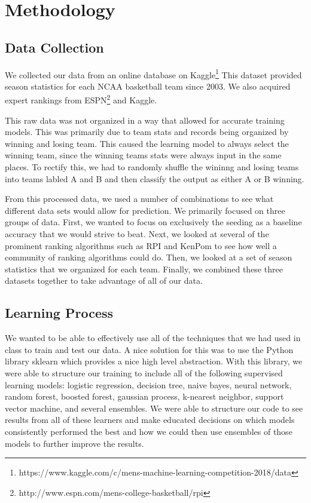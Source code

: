 \section{Methodology}

\subsection{Data Collection}
We collected our data from an online database on Kaggle\footnote{https://www.kaggle.com/c/mens-machine-learning-competition-2018/data}
This dataset provided season statistics for each NCAA basketball team since 2003.
We also acquired expert rankings from ESPN\footnote{http://www.espn.com/mens-college-basketball/rpi} and Kaggle.

This raw data was not organized in a way that allowed for accurate training models.
This was primarily due to team stats and records being organized by winning and losing team.
This caused the learning model to always select the winning team, since the winning teams stats were always input in the same places.
To rectify this, we had to randomly shuffle the wininng and losing teams into teams labled A and B and then classify the output as either A or B winning.

From this processed data, we used a number of combinations to see what different data sets would allow for prediction.
We primarily focused on three groups of data. 
First, we wanted to focus on exclusively the seeding as a baseline accuracy that we would strive to beat.
Next, we looked at several of the prominent ranking algorithms such as RPI and KenPom to see how well a community of ranking algorithms could do.
Then, we looked at a set of season statistics that we organized for each team. 
Finally, we combined these three datasets together to take advantage of all of our data.

\subsection{Learning Process}
We wanted to be able to effectively use all of the techniques that we had used in class to train and test our data.
A nice solution for this was to use the Python library sklearn which provides a nice high level abstraction.
With this library, we were able to structure our training to include all of the following supervised learning models: logistic regression, decision tree, naive bayes, neural network, random forest, boosted forest, gaussian process, k-nearest neighbor, support vector machine, and several ensembles.
We were able to structure our code to see results from all of these learners and make educated decisions on which models consistently performed the best and how we could then use ensembles of those models to further improve the results.